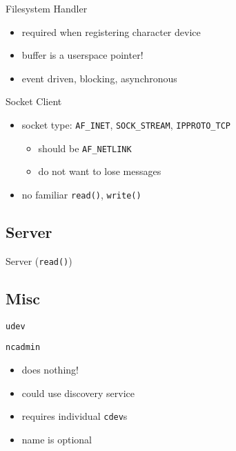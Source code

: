 \documentclass[handout]{beamer}
\begin{document}
\begin{frame}{Filesystem Handler}
  

  \begin{itemize}
    \item<1-> required when registering character device
    \item<2-> buffer is a userspace pointer!
    \item<3-> event driven, blocking, asynchronous
  \end{itemize}
\end{frame}

\begin{frame}{Socket Client}
  \begin{itemize}
    \item<1-> socket type: \texttt{AF\_INET}, \texttt{SOCK\_STREAM}, \texttt{IPPROTO\_TCP}
    \begin{itemize}
      \item<2-> should be \texttt{AF\_NETLINK}
      \item<2-> do not want to lose messages
    \end{itemize}
    \item<3-> no familiar \texttt{read()}, \texttt{write()}
  \end{itemize}
\end{frame}

\subsection{Server}

\begin{frame}{Server (\texttt{read()})}
  
\end{frame}

\subsection{Misc}

\begin{frame}[t]{\texttt{udev}}
  
  
\end{frame}

\begin{frame}{\texttt{ncadmin}}
  
  \begin{itemize}
    \item<2-> does nothing!
    \item<3-> could use discovery service
    \item<4-> requires individual \texttt{cdev}s
    \item<5-> name is optional
  \end{itemize}
\end{frame}
\end{document}
